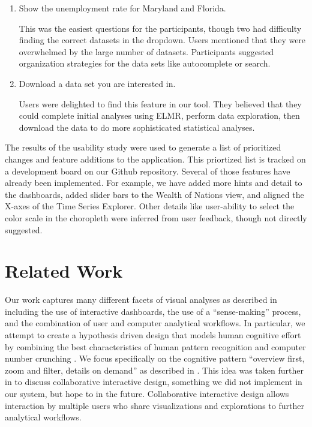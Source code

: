 \documentclass{sigchi}
\begin{document}
\begin{enumerate}
\item     Show the unemployment rate for Maryland and Florida.

This was the easiest questions for the participants, though two had difficulty finding the correct datasets in the dropdown. Users mentioned that they were overwhelmed by the large number of datasets. Participants suggested organization strategies for the data sets like autocomplete or search.

\item     Download a data set you are interested in.

Users were delighted to find this feature in our tool. They believed that they could complete initial analyses using ELMR, perform data exploration, then download the data to do more sophisticated statistical analyses.

\end{enumerate}

The results of the usability study were used to generate a list of prioritized changes and feature additions to the application. This priortized list is tracked on a development board on our Github repository. Several of those features have already been implemented. For example, we have added more hints and detail to the dashboards, added slider bars to the Wealth of Nations view, and aligned the X-axes of the Time Series Explorer. Other details like user-ability to select the color scale in the choropleth were inferred from user feedback, though not directly suggested. 

\section{Related Work}

Our work captures many different facets of visual analyses as described in \cite{keim_mastering_2010} including the use of interactive dashboards, the use of a ``sense-making'' process, and the combination of user and computer analytical workflows. In particular, we attempt to create a hypothesis driven design that models human cognitive effort by combining the best characteristics of human pattern recognition and computer number crunching \cite{green_visual_2008}. We focus specifically on the cognitive pattern ``overview first, zoom and filter, details on demand'' as described in \cite{heer_interactive_2012}. This idea was taken further in \cite{heer_design_2008} to discuss collaborative interactive design, something we did not implement in our system, but hope to in the future. Collaborative interactive design allows interaction by multiple users who share visualizations and explorations to further analytical workflows.
\end{document}
